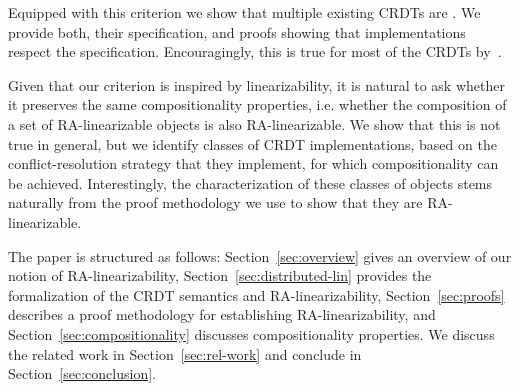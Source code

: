 Equipped with this criterion we show that multiple existing CRDTs are
\crdtlinearizable{}.
%
We provide both, their \CRDTLinshort{} specification, and proofs
showing that implementations respect the specification.
%
Encouragingly, this is true for most of the CRDTs
by~\citet{ShapiroPBZ11}.

Given that our criterion is inspired by
linearizability, it is natural to ask whether it
preserves the same compositionality properties, i.e.
whether the composition of a set of RA-linearizable objects is also RA-linearizable.
%
We show that this is not true in general, but we identify classes of
CRDT implementations, based on the conflict-resolution strategy that
they implement, for which compositionality can be achieved. Interestingly, the characterization of these 
classes of objects stems naturally from the proof methodology we use to show that they are RA-linearizable.


The paper is structured as follows:
Section~\ref{sec:overview} gives an overview of our notion of RA-linearizability, Section~\ref{sec:distributed-lin} provides the formalization of the CRDT semantics and RA-linearizability, Section~\ref{sec:proofs} describes a proof methodology for establishing RA-linearizability, and Section~\ref{sec:compositionality} discusses compositionality properties. We discuss the related work in Section~\ref{sec:rel-work} and conclude in Section~\ref{sec:conclusion}.





